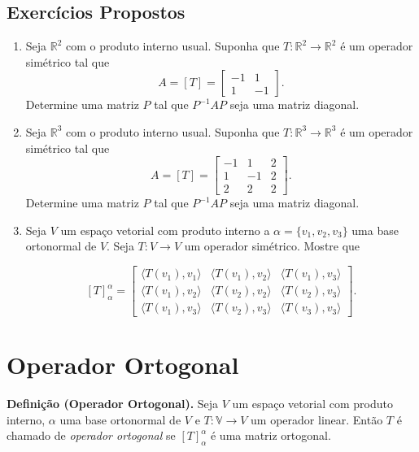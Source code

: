 \subsection{Exercícios Propostos}
\begin{enumerate}
\item Seja $\mathbb{R}^2$  com o produto interno usual. Suponha que $T: \mathbb{R}^2  \rightarrow  \mathbb{R}^2$  é um operador simétrico  tal que
$$A=[T]=\left[ \begin{array}{cc}-1 &1 \\1 & -1   \end{array} \right].$$  Determine uma matriz $P$ tal que $P^{-1}AP$ seja uma matriz diagonal.

\item Seja $\mathbb{R}^3$  com o produto interno usual. Suponha que $T: \mathbb{R}^3  \rightarrow  \mathbb{R}^3$  é um operador simétrico  tal que
$$A=[T]=\left[ \begin{array}{ccc}-1 &1&2 \\1 & -1 &2 \\2 & 2& 2  \end{array} \right].$$  Determine uma matriz $P$ tal que $P^{-1}AP$ seja uma matriz diagonal.

\item Seja $V$ um espaço vetorial com produto interno a $\alpha = \{v_1, v_2, v_3 \}$ uma base ortonormal de $V$. Seja $ T: V \rightarrow V$ um operador simétrico. Mostre que

$$ [T]_{\alpha}^{\alpha}=\left[ \begin{array}{ccc}
\langle T(v_1), v_1\rangle &\langle  T(v_1), v_2\rangle  & \langle T(v_1), v_3\rangle \\
\langle T(v_1), v_2 \rangle &\langle T(v_2), v_2 \rangle  & \langle  T(v_2), v_3\rangle \\
\langle T(v_1), v_3 \rangle &\langle T(v_2), v_3\rangle  & \langle T(v_3), v_3\rangle    \end{array} \right]. $$
\end{enumerate}

\section{Operador Ortogonal}

\textbf{Definição (Operador Ortogonal).} Seja $V$ um espaço vetorial com  produto interno,  $\alpha$  uma  base ortonormal de $V$  e $T: \mathbb V \rightarrow V$  um operador linear. Então $T$ é chamado de \textit{operador ortogonal} se $[T]_{\alpha}^{\alpha}$ é uma matriz ortogonal.



